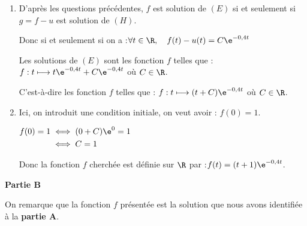 \begin{enumerate}
\begin{enumerate}
Les solutions sont les fonctions de la forme : $g : t \longmapsto C\e^{-0,4t}$ où $C \in \R$.

\item D'après les questions précédentes, $f$ est solution de $(E)$ si et seulement si \linebreak $g = f - u$ est solution de $(H)$.

	Donc si et seulement si on a :\quad  $\forall t \in \R, \quad f(t) - u(t) = C\e^{-0,4t}$

Les solutions de $(E)$ sont les fonction $f$ telles que : $f : t \longmapsto t\e^{-0,4t} + C\e^{-0,4t}$ où $C \in \R$.

C'est-à-dire les fonction $f$ telles que : $f : t \longmapsto (t + C)\e^{-0,4t}$ où $C \in \R$.

\item Ici, on introduit une condition initiale, on veut avoir : \quad $f(0) = 1$.

$\begin{aligned}
f(0) = 1 & \iff (0 + C)\e^{0} = 1\\
	&\iff C = 1\\
\end{aligned}$

Donc la fonction $f$ cherchée est définie sur $\R$ par :\quad $f(t) = (t + 1)\e^{-0,4t}$.
	\end{enumerate}
\end{enumerate}

\bigskip

\textbf{Partie B}

\medskip

On remarque que la fonction $f$ présentée est la solution que nous avons identifiée à la \textbf{partie A}.

